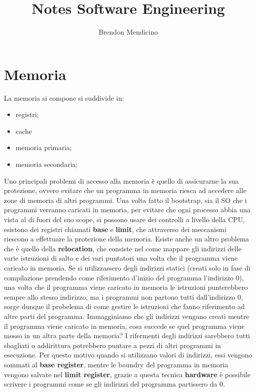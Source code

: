 \documentclass[12pt]{article}
\title{Notes Software Engineering}
\author{Brendon Mendicino}
\begin{document}
\maketitle
\newpage
\tableofcontents




\newpage
\section{Memoria}
La memoria si compone si suddivide in:
\begin{itemize}
  \item registri;
  \item cache
  \item memoria primaria;
  \item memoria secondaria;
\end{itemize}
Uno principali problemi di accesso alla memoria \`e quello di assicurarne la sua protezione, ovvero evitare che un programma in memoria riesca ad accedere alle zone di memoria di altri programmi. Una volta fatto il bootstrap, sia il SO che i programmi verranno caricati in memoria, per evitare che ogni processo abbia una vista al di fuori del suo scope, si possono usare dei controlli a livello della CPU, esistono dei registri chiamati \textbf{base} e \textbf{limit}, che attraverso dei meccanismi riescono a effettuare la protezione della memoria. Esiste anche un altro problema che \`e quello della \textbf{relocation}, che consiste nel come mappare gli indirizzi delle varie istruzioni di salto e dei vari puntatori una volta che il programma viene caricato in memoria. Se si utilizzassero degli indirizzi statici (creati solo in fase di compilazione prendendo come riferimento d'inizio del programma l'indirizzo $0$), una volta che il programma viene caricato in memoria le istruzioni punterebbero sempre allo stesso indirizzo, ma i programmi non partono tutti dall'indirizzo $0$, sorge dunque il probelema di come gestire le istruzioni che fanno riferimento ad altre parti del programma. Immagginiamo che gli indirizzi vengano creati mentre il programma viene caricato in memoria, cosa succede se quel programma viene mosso in un altra parte della memoria? I rifermenti degli indirizzi sarebbero tutti sbagliati o addirittura potrebbero puntare a pezzi di altri programmi in esecuzione. Per questo motivo quando si utilizzano valori di indirizzi, essi vengono sommati al \textbf{base register}, mentre le boundry del programma in memoria vengono salvate nel \textbf{limit register}, grazie a questa tecnica \textbf{hardware} \`e possibile scrivere i programmi come se gli indirizzi del programma partissero da $0$.
\end{document}
